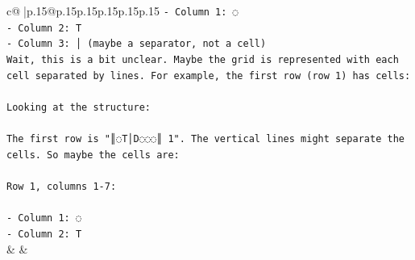 \documentclass{article}
\begin{document}
{\begin{supertabular}{c@{$\;$}|p{.15\linewidth}@{}p{.15\linewidth}p{.15\linewidth}p{.15\linewidth}p{.15\linewidth}p{.15\linewidth}}
{{{\texttt{{-} Column 1: ◌} \\
\texttt{{-} Column 2: T} \\
\texttt{{-} Column 3: │ (maybe a separator, not a cell)} \\
\texttt{Wait, this is a bit unclear. Maybe the grid is represented with each cell separated by lines. For example, the first row (row 1) has cells:} \\
\\ 
\texttt{Looking at the structure:} \\
\\ 
\texttt{The first row is "║◌T│D◌◌◌║ 1". The vertical lines might separate the cells. So maybe the cells are:} \\
\\ 
\texttt{Row 1, columns 1{-}7:} \\
\\ 
\texttt{{-} Column 1: ◌} \\
\texttt{{-} Column 2: T} \\
            }
        }
    }
    & & \\ \\


\end{supertabular}}
\end{document}
